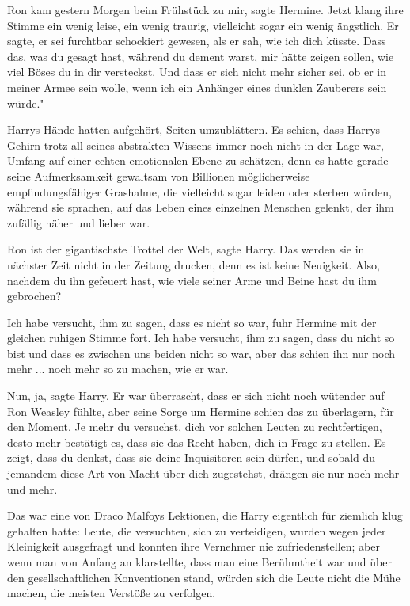 \glqq Ron kam gestern Morgen beim Frühstück zu mir\grqq{}, sagte Hermine. Jetzt
klang ihre Stimme ein wenig leise, ein wenig traurig, vielleicht sogar ein wenig
ängstlich. \glqq Er sagte, er sei furchtbar schockiert gewesen, als er sah, wie
ich dich küsste. Dass das, was du gesagt hast, während du dement warst, mir
hätte zeigen sollen, wie viel Böses du in dir versteckst. Und dass er sich nicht
mehr sicher sei, ob er in meiner Armee sein wolle, wenn ich ein Anhänger eines
dunklen Zauberers sein würde."

Harrys Hände hatten aufgehört, Seiten umzublättern. Es schien, dass Harrys
Gehirn trotz all seines abstrakten Wissens immer noch nicht in der Lage war,
Umfang auf einer echten emotionalen Ebene zu schätzen, denn es hatte gerade
seine Aufmerksamkeit gewaltsam von Billionen möglicherweise empfindungsfähiger
Grashalme, die vielleicht sogar leiden oder sterben würden, während sie
sprachen, auf das Leben eines einzelnen Menschen gelenkt, der ihm zufällig näher
und lieber war.

\glqq Ron ist der gigantischste Trottel der Welt\grqq{}, sagte Harry. \glqq Das
werden sie in nächster Zeit nicht in der Zeitung drucken, denn es ist keine
Neuigkeit. Also, nachdem du ihn gefeuert hast, wie viele seiner Arme und Beine
hast du ihm gebrochen?\grqq{}

\glqq Ich habe versucht, ihm zu sagen, dass es nicht so war\grqq{}, fuhr Hermine
mit der gleichen ruhigen Stimme fort. \glqq Ich habe versucht, ihm zu sagen,
dass du nicht so bist und dass es zwischen uns beiden nicht so war, aber das
schien ihn nur noch mehr ... noch mehr so zu machen, wie er war.\grqq{}

\glqq Nun, ja\grqq{}, sagte Harry. Er war überrascht, dass er sich nicht noch
wütender auf Ron Weasley fühlte, aber seine Sorge um Hermine schien das zu
überlagern, für den Moment. \glqq Je mehr du versuchst, dich vor solchen Leuten
zu rechtfertigen, desto mehr bestätigt es, dass sie das Recht haben, dich in
Frage zu stellen. Es zeigt, dass du denkst, dass sie deine Inquisitoren sein
dürfen, und sobald du jemandem diese Art von Macht über dich zugestehst, drängen
sie nur noch mehr und mehr.\grqq{}

Das war eine von Draco Malfoys Lektionen, die Harry eigentlich für ziemlich klug
gehalten hatte: Leute, die versuchten, sich zu verteidigen, wurden wegen jeder
Kleinigkeit ausgefragt und konnten ihre Vernehmer nie zufriedenstellen; aber
wenn man von Anfang an klarstellte, dass man eine Berühmtheit war und über den
gesellschaftlichen Konventionen stand, würden sich die Leute nicht die Mühe
machen, die meisten Verstöße zu verfolgen.

